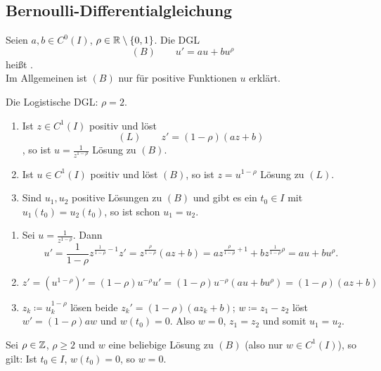 \subsection{Bernoulli-Differentialgleichung}
Seien $ a,b\in C^0(I) $, $ \rho\in\mathbb{R}\setminus\lbrace 0,1\rbrace $. Die DGL
\[ (B)\qquad u'=au+bu^\rho \]
hei\ss t .\\
Im Allgemeinen ist $ (B) $ nur f\"ur positive Funktionen $ u $ erkl\"art.
\begin{beispiel*}
	Die Logistische DGL: $ \rho=2 $.
\end{beispiel*}
\begin{lemma}
	\bullshit
	\begin{enumerate}
		\item Ist $ z\in C^1(I) $ positiv und l\"ost \[ (L)\qquad z'=(1-\rho)(az+b) \], so ist $ u=\frac{1}{z^{1-\rho}} $ L\"osung zu $ (B) $.
		\item Ist $ u\in C^1(I) $ positiv und l\"ost $ (B) $, so ist $ z=u^{1-\rho} $ L\"osung zu $ (L) $.
		\item Sind $ u_1,u_2 $ positive L\"osungen zu $ (B) $ und gibt es ein $ t_0\in I $ mit $ u_1(t_0)=u_2(t_0) $, so ist schon $ u_1=u_2 $.
 	\end{enumerate}
\end{lemma}
\begin{beweis}
	\begin{enumerate}
		\item Sei $ u=\frac{1}{z^{1-\rho}} $. Dann
		\[ u'=\frac{1}{1-\rho}z^{\frac{1}{1-\rho}-1}z'=z^{\frac{\rho}{1-\rho}}(az+b)=az^{\frac{\rho}{1-\rho}+1}+bz^{\frac{1}{1-\rho}\rho}=au+bu^\rho. \]
		\item 
		\[ z'=(u^{1-\rho})'=(1-\rho)u^{-\rho}u'=(1-\rho)u^{-\rho}(au+bu^{\rho})=(1-\rho)(az+b) \]
		\item $ z_k\coloneqq u_k^{1-\rho} $ l\"osen beide $ z_k'=(1-\rho)(az_k+b) $; $ w\coloneqq z_1-z_2 $ l\"ost $ w'=(1-\rho)aw $ und $ w(t_0)=0 $. Also $ w=0 $, $ z_1=z_2 $ und somit $ u_1=u_2 $.
	\end{enumerate}
\end{beweis}
\begin{lemma}
	Sei $ \rho\in\mathbb{Z} $, $ \rho\geq 2 $ und $ w $ eine beliebige L\"osung zu $ (B) $ (also nur $ w\in C^1(I) $), so gilt: Ist $ t_0\in I $, $ w(t_0)=0 $, so $ w=0 $.
\end{lemma}
